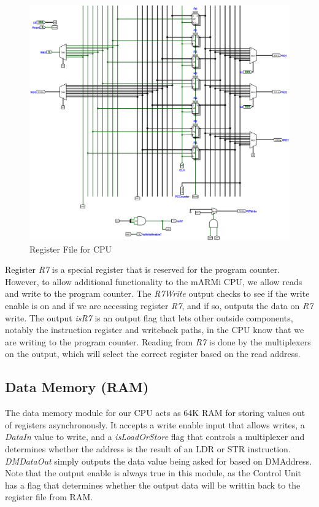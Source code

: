 \documentclass[12pt, letter]{article}
\begin{document}
	\begin{figure}[h]
		\centering
		\includegraphics[scale = 0.2]{RegisterFile}
		\caption{Register File for CPU}
		\label{fig:RegisterFile}
	\end{figure}
	
	Register \textit{R7} is a special register that is reserved for the program counter. However, to allow additional functionality to the mARMi CPU, we allow reads and write to the program counter. The \textit{R7Write} output checks to see if the write enable is on and if we are accessing register \textit{R7}, and if so, outputs the data on \textit{R7} write. The output \textit{isR7} is an output flag that lets other outside components, notably the instruction register and writeback paths, in the CPU know that we are writing to the program counter. Reading from \textit{R7} is done by the multiplexers on the output, which will select the correct register based on the read address. 
	
	
	\newpage
	
	\subsection{Data Memory (RAM)}
	
	The data memory module for our CPU acts as 64K RAM for storing values out of registers asynchronously. It accepts a write enable input that allows writes, a \textit{DataIn} value to write, and a \textit{isLoadOrStore} flag that controls a multiplexer and determines whether the address is the result of an LDR or STR instruction. \textit{DMDataOut} simply outputs the data value being asked for based on DMAddress. Note that the output enable is always true in this module, as the Control Unit has a flag that determines whether the output data will be writtin back to the register file from RAM.
	
\end{document}
